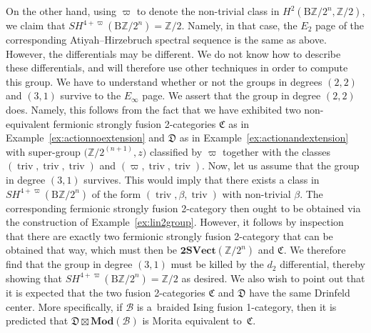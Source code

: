 \documentclass[10pt,a4paper]{amsart}
\numberwithin{equation}{section}
\begin{document}
\begin{Example}
On the other hand, using $\varpi$ to denote the non-trivial class in $H^2(\mathrm{B}\mathbb{Z}/2^{n},\mathbb{Z}/2)$, we claim that $SH^{4+\varpi}(\mathrm{B}\mathbb{Z}/2^{n})=\mathbb{Z}/2$. Namely, in that case, the $E_2$ page of the corresponding Atiyah--Hirzebruch spectral sequence is the same as above. However, the differentials  may be different. We do not know how to describe these differentials, and will therefore use other techniques in order to compute this group. We have to understand whether or not the groups in degrees $(2,2)$ and $(3,1)$ survive to the $E_{\infty}$ page. We assert that the group in degree $(2,2)$ does. Namely, this follows from the fact that we have exhibited two non-equivalent fermionic strongly fusion 2-categories $\mathfrak{C}$ as in Example~\ref{ex:actionnoextension} and $\mathfrak{D}$ as in Example~\ref{ex:actionandextension} with super-group $\bigl(\mathbb{Z}/2^{(n+1)},z\bigr)$ classified by $\varpi$ together with the classes $(\operatorname{triv},\operatorname{triv},\operatorname{triv})$ and $(\varpi,\operatorname{triv},\operatorname{triv})$. Now, let us assume that the group in degree $(3,1)$ survives. This would imply that there exists a class in $SH^{4+\varpi}(\mathrm{B}\mathbb{Z}/2^{n})$ of the form $(\operatorname{triv},\beta,\operatorname{triv})$ with non-trivial $\beta$. The corresponding fermionic strongly fusion 2-category then ought to be obtained via the construction of Example~\ref{ex:lin2group}. However, it follows by inspection that there are exactly two fermionic strongly fusion 2-category that can be obtained that way, which must then be $\mathbf{2SVect}(\mathbb{Z}/2^n)$ and $\mathfrak{C}$. We therefore find that the group in degree $(3,1)$ must be killed by the $d_2$ differential, thereby showing that $SH^{4+\varpi}(\mathrm{B}\mathbb{Z}/2^{n})=\mathbb{Z}/2$ as desired. We also wish to point out that it is expected that the two fusion 2-categories $\mathfrak{C}$ and $\mathfrak{D}$ have the same Drinfeld center. More specifically, if $\mathcal{B}$ is a~braided Ising fusion 1-category, then it is predicted that $\mathfrak{D}\boxtimes\mathbf{Mod}(\mathcal{B})$ is Morita equivalent to~$\mathfrak{C}$.
\end{Example}
\end{document}
